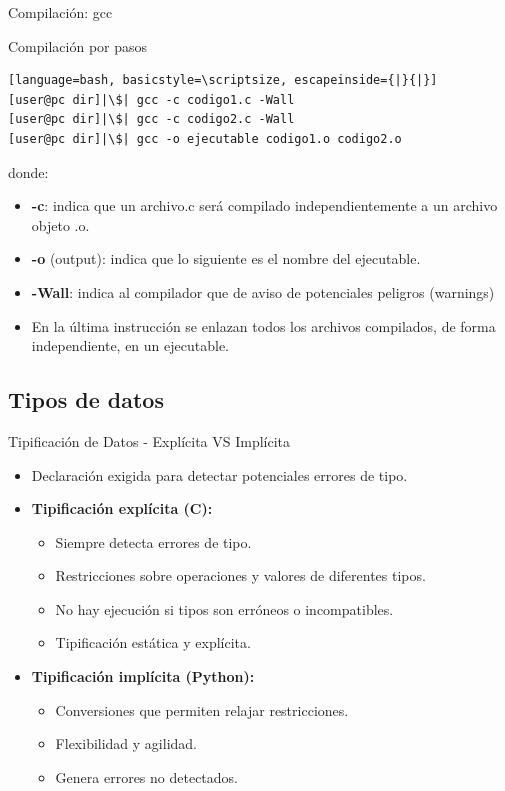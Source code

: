 \documentclass{beamer}
\begin{document}
\begin{frame}[fragile]{Compilación: gcc}

\begin{exampleblock}{Compilación por pasos}
\begin{lstlisting}[language=bash, basicstyle=\scriptsize, escapeinside={|}{|}]
[user@pc dir]|\$| gcc -c codigo1.c -Wall
[user@pc dir]|\$| gcc -c codigo2.c -Wall
[user@pc dir]|\$| gcc -o ejecutable codigo1.o codigo2.o 
\end{lstlisting}
\end{exampleblock}
{\footnotesize
donde:
\begin{itemize}
\item \textbf{-c}: indica que un archivo.c será compilado independientemente a un archivo objeto .o.
\item \textbf{-o} (output): indica que lo siguiente es el nombre del ejecutable. 
\item \textbf{-Wall}: indica al compilador que de aviso de potenciales peligros (warnings)
\item En la última instrucción se enlazan todos los archivos compilados, de forma independiente, en un ejecutable. 
\end{itemize}
}
\end{frame}


\subsection{Tipos de datos}
\begin{frame}[fragile]{Tipificación de Datos - Explícita VS Implícita}
\begin{itemize}
	\item Declaración exigida para detectar potenciales errores de tipo.
	\item \textbf{Tipificación explícita (C): } 
	\begin{itemize}
		\item Siempre detecta errores de tipo. 
		\item Restricciones sobre operaciones y valores de diferentes tipos.
		\item No hay ejecución si tipos son erróneos o incompatibles. 
		\item Tipificación estática y explícita.
	\end{itemize}
	\item \textbf{Tipificación implícita (Python): } 
	\begin{itemize}
		\item Conversiones que permiten relajar restricciones.
		\item Flexibilidad y agilidad.
		\item Genera errores no detectados.
	\end{itemize}
	
\end{itemize}
\end{frame}
\end{document}
